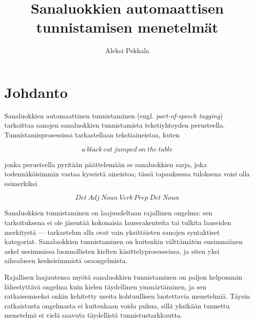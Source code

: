 \documentclass[utf8,bachelor,manualbib]{gradu3}
\begin{document}
\title{Sanaluokkien automaattisen tunnistamisen menetelmät}



\author{Aleksi Pekkala}

\maketitle
  
\mainmatter


\chapter{Johdanto}


Sanaluokkien automaattinen tunnistaminen (engl. \emph{part-of-speech tagging}) tarkoittaa sanojen sanaluokkien tunnistamista tekstiyhteyden perusteella.  Tunnistamisprosessissa tarkastellaan tekstiaineistoa, kuten

\[a\:black\:cat\:jumped\:on\:the\:table\]

jonka perusteella pyritään päättelemään se sanaluokkien sarja, joka todennäköisimmin vastaa kyseistä aineistoa; tässä tapauksessa tuloksena voisi olla esimerkiksi

\[Det\:Adj\:Noun\:Verb\:Prep\:Det\:Noun\]

Sanaluokkien tunnistaminen on laajuudeltaan rajallinen ongelma: sen tarkoituksena ei ole jäsentää kokonaisia lauserakenteita tai tulkita lauseiden merkitystä --- tarkastelun alla ovat vain yksittäisten sanojen syntaktiset kategoriat. Sanaluokkien tunnistaminen on kuitenkin välttämätön ensimmäinen askel useimmissa luonnollisten kielten käsittelyprosesseissa, ja siten yksi aihealueen keskeisimmistä osaongelmista.

Rajallisen laajuutensa myötä sanaluokkien tunnistaminen on paljon helpommin lähestyttävä ongelma kuin kielen täydellinen ymmärtäminen, ja sen ratkaisemiseksi onkin kehitetty useita kohtuullisen luotettavia menetelmiä. Täysin ratkaistusta ongelmasta ei kuitenkaan voida puhua, sillä yksikään tunnettu menetelmä ei vielä saavuta täydellistä tunnistustarkkuutta.
\end{document}
